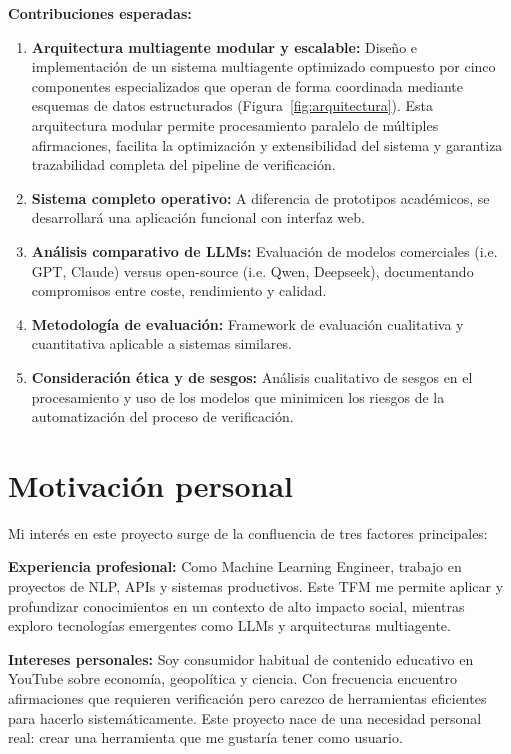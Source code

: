 \documentclass[12pt,a4paper]{article}
\begin{document}
\textbf{Contribuciones esperadas:}

\begin{enumerate}
    \item \textbf{Arquitectura multiagente modular y escalable:} Diseño e implementación de un sistema multiagente optimizado compuesto por cinco componentes especializados que operan de forma coordinada mediante esquemas de datos estructurados (Figura~\ref{fig:arquitectura}). Esta arquitectura modular permite procesamiento paralelo de múltiples afirmaciones, facilita la optimización y extensibilidad del sistema y garantiza trazabilidad completa del pipeline de verificación.

    \item \textbf{Sistema completo operativo:} A diferencia de prototipos académicos, se desarrollará una aplicación funcional con interfaz web.

    \item \textbf{Análisis comparativo de LLMs:} Evaluación de modelos comerciales (i.e. GPT, Claude) versus open-source (i.e. Qwen, Deepseek), documentando compromisos entre coste, rendimiento y calidad.

    \item \textbf{Metodología de evaluación:} Framework de evaluación cualitativa y cuantitativa aplicable a sistemas similares.

    \item \textbf{Consideración ética y de sesgos:} Análisis cualitativo de sesgos en el procesamiento y uso de los modelos que minimicen los riesgos de la automatización del proceso de verificación.
\end{enumerate}

\section{Motivación personal}

Mi interés en este proyecto surge de la confluencia de tres factores principales:

\textbf{Experiencia profesional:} Como Machine Learning Engineer, trabajo en proyectos de NLP, APIs y sistemas productivos. Este TFM me permite aplicar y profundizar conocimientos en un contexto de alto impacto social, mientras exploro tecnologías emergentes como LLMs y arquitecturas multiagente.

\textbf{Intereses personales:} Soy consumidor habitual de contenido educativo en YouTube sobre economía, geopolítica y ciencia. Con frecuencia encuentro afirmaciones que requieren verificación pero carezco de herramientas eficientes para hacerlo sistemáticamente. Este proyecto nace de una necesidad personal real: crear una herramienta que me gustaría tener como usuario.
\end{document}
